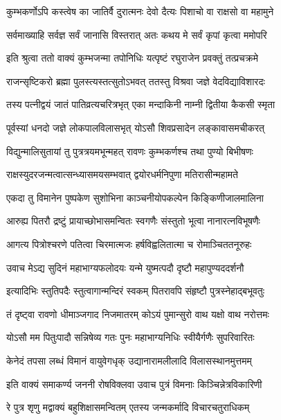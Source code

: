 \twolineshloka
{कुम्भकर्णोऽपि कस्त्वेष का जातिर्वै दुरात्मनः}
{देवो दैत्यः पिशाचो वा राक्षसो वा महामुने}%

\twolineshloka
{सर्वमाख्याहि सर्वज्ञ सर्वं जानासि विस्तरात्}
{अतः कथय मे सर्वं कृपां कृत्वा ममोपरि}%

\twolineshloka
{इति श्रुत्वा ततो वाक्यं कुम्भजन्मा तपोनिधिः}
{यत्पृष्टं रघुराजेन प्रवक्तुं तत्प्रचक्रमे}%

\twolineshloka
{राजन्सृष्टिकरो ब्रह्मा पुलस्त्यस्तत्सुतोऽभवत्}
{ततस्तु विश्रवा जज्ञे वेदविद्याविशारदः}%

\twolineshloka
{तस्य पत्नीद्वयं जातं पातिव्रत्यचरित्रभृत्}
{एका मन्दाकिनी नाम्नी द्वितीया कैकसी स्मृता}%

\twolineshloka
{पूर्वस्यां धनदो जज्ञे लोकपालविलासभृत्}
{योऽसौ शिवप्रसादेन लङ्कावासमचीकरत्}%

\twolineshloka
{विद्युन्मालिसुतायां तु पुत्रत्रयमभून्महत्}
{रावणः कुम्भकर्णश्च तथा पुण्यो बिभीषणः}%

\twolineshloka
{राक्षस्युदरजन्मत्वात्सन्ध्यासमयसम्भवात्}
{द्वयोरधर्मनिपुणा मतिरासीन्महामते}%

\twolineshloka
{एकदा तु विमानेन पुष्पकेण सुशोभिना}
{काञ्चनीयोपकल्पेन किङ्किणीजालमालिना}%

\twolineshloka
{आरुह्य पितरौ द्रष्टुं प्रायाच्छोभासमन्वितः}
{स्वगणैः संस्तुतो भूत्वा नानारत्नविभूषणैः}%

\twolineshloka
{आगत्य पित्रोश्चरणे पतित्वा चिरमात्मजः}
{हर्षविह्वलितात्मा च रोमाञ्चिततनूरुहः}%

\twolineshloka
{उवाच मेऽद्य सुदिनं महाभाग्यफलोदयः}
{यन्मे युष्मत्पदौ दृष्टौ महापुण्यददर्शनौ}%

\twolineshloka
{इत्यादिभिः स्तुतिपदैः स्तुत्वागान्मन्दिरं स्वकम्}
{पितरावपि संहृष्टौ पुत्रस्नेहाद्बभूवतुः}%

\twolineshloka
{तं दृष्ट्वा रावणो धीमाञ्जगाद निजमातरम्}
{कोऽयं पुमान्सुरो वाथ यक्षो वाथ नरोत्तमः}%

\twolineshloka
{योऽसौ मम पितुःपादौ सन्निषेव्य गतः पुनः}
{महाभाग्यनिधिः स्वीयैर्गणैः सुपरिवारितः}%

\twolineshloka
{केनेदं तपसा लब्धं विमानं वायुवेगधृक्}
{उद्यानारामलीलादि विलासस्थानमुत्तमम्}%


\twolineshloka
{इति वाक्यं समाकर्ण्य जननी रोषविक्लवा}
{उवाच पुत्रं विमनाः किञ्चिन्नेत्रविकारिणी}%

\twolineshloka
{रे पुत्र शृणु मद्वाक्यं बहुशिक्षासमन्वितम्}
{एतस्य जन्मकर्मादि विचारचतुराधिकम्}%

